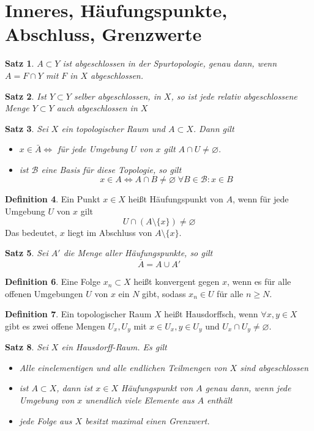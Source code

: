 \documentclass[a4paper, 12pt]{article}
\theoremstyle{plain}
\newtheorem{theorem}{Satz}[section] %
\theoremstyle{definition}
\newtheorem{definition}[theorem]{Definition} %
\theoremstyle{lemma}
\theoremstyle{remark}
\theoremstyle{corollary}
\theoremstyle{example}
\begin{document}
	\section{Inneres, Häufungspunkte, Abschluss, Grenzwerte}
	\begin{theorem}
		$A\subset Y$ ist abgeschlossen in der Spurtopologie, genau dann, wenn $A = F \cap Y$ mit $F$ in $X$ abgeschlossen.
	\end{theorem}
	\begin{theorem}
		Ist $Y\subset Y$ selber abgeschlossen, in $X$, so ist jede relativ abgeschlossene Menge $Y\subset Y$ auch abgeschlossen in $X$
	\end{theorem}
	\begin{theorem}
		Sei $X$ ein topologischer Raum und $A \subset X$. Dann gilt \begin{itemize}
			\item $x \in \bar{A} \Leftrightarrow $ für jede Umgebung $U$ von $x$ gilt $A \cap U \neq \varnothing$.
			\item ist $\mathcal{B}$ eine Basis für diese Topologie, so gilt \[x \in A \Leftrightarrow A \cap B \neq \varnothing \; \forall B \in \mathcal{B}: x \in B\]
		\end{itemize}
	\end{theorem}
	\begin{definition}
		Ein Punkt $x \in X$ heißt Häufungspunkt von $A$, wenn für jede Umgebung $U$ von $x$ gilt \[U \cap (A \setminus \{x\}) \neq \varnothing\] Das bedeutet, $x$ liegt im Abschluss von $A \setminus \{x\}$.	
	\end{definition}
	\begin{theorem}
		Sei $A'$ die Menge aller Häufungspunkte, so gilt \[\bar{A} = A \cup A'\]
	\end{theorem}
	\begin{definition}
		Eine Folge $x_n \subset X$ heißt konvergent gegen $x$, wenn es für alle offenen Umgebungen $U$ von $x$ ein $N$ gibt, sodass $x_n \in U$ für alle $n \geq N$. 
	\end{definition}
	\begin{definition}
		Ein topologischer Raum $X$ heißt Hausdorffsch, wenn $\forall x,y \in X$ gibt es zwei offene Mengen $U_x, U_y$ mit $x \in U_x, y \in U_y$ und $U_x \cap U_y \neq \varnothing$.
	\end{definition}
	\begin{theorem}
		Sei $X$ ein Hausdorff-Raum. Es gilt \begin{itemize}
			\item Alle einelementigen und alle endlichen Teilmengen von $X$ sind abgeschlossen
			\item ist $A \subset X$, dann ist $x \in X$ Häufungspunkt von $A$ genau dann, wenn jede Umgebung von $x$ unendlich viele Elemente aus $A$ enthält
			\item jede Folge aus $X$ besitzt maximal einen Grenzwert.
		\end{itemize}
	\end{theorem}
\end{document}
